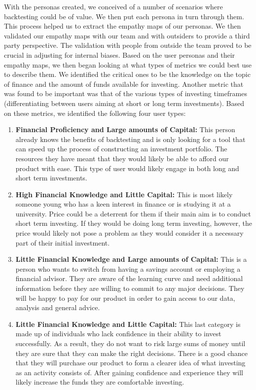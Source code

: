 \documentclass[main.tex]{subfiles}
\begin{document}
With the personas created, we conceived of a number of scenarios where backtesting could be of value. We then put each persona in turn through them. This process helped us to extract the empathy maps \cite{empathy_maps} of our personas. We then validated our empathy maps with our team and with outsiders to provide a third party perspective. The validation with people from outside the team proved to be crucial in adjusting for internal biases.
Based on the user personas and their empathy maps, we then began looking at what types of metrics we could best use to describe them. We identified the critical ones to be the knowledge on the topic of finance and the amount of funds available for investing. Another metric that was found to be important was that of the various types of investing timeframes (differentiating between users aiming at short or long term investments). Based on these metrics, we identified the following four user types:

\begin{enumerate}
    \item \textbf{Financial Proficiency and Large amounts of Capital:  }This person already knows the benefits of backtesting and is only looking for a tool that can speed up the process of constructing an investment portfolio. The resources they have meant that they would likely be able to afford our product with ease. This type of user would likely engage in both long and short term investments.
    \item \textbf{High Financial Knowledge and Little Capital:  } This is most likely someone young who has a keen interest in finance or is studying it at a university. Price could be a deterrent for them if their main aim is to conduct short term investing. If they would be doing long term investing, however, the price would likely not pose a problem as they would consider it a necessary part of their initial investment.
    \item \textbf{Little Financial Knowledge and Large amounts of Capital:  }This is a person who wants to switch from having a savings account or employing a financial advisor. They are aware of the learning curve and need additional information before they are willing to commit to any major decisions. They will be happy to pay for our product in order to gain access to our data, analysis and general advice.
    \item \textbf{Little Financial Knowledge and Little Capital:  }This last category is made up of individuals who lack confidence in their ability to invest successfully. As a result, they do not want to risk large sums of money until they are sure that they can make the right decisions. There is a good chance that they will purchase our product to form a clearer idea of what investing as an activity consists of. After gaining confidence and experience they will likely increase the funds they are comfortable investing.
\end{enumerate}
\end{document}
